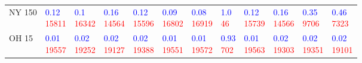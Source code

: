 \begin{tabular}{llllllllllll}
NY 150 & \makecell{\textcolor{blue}{0.12} \\ \textcolor{red}{15811}} & \makecell{\textcolor{blue}{0.1} \\ \textcolor{red}{16342}} & \makecell{\textcolor{blue}{0.16} \\ \textcolor{red}{14564}} & \makecell{\textcolor{blue}{0.12} \\ \textcolor{red}{15596}} & \makecell{\textcolor{blue}{0.09} \\ \textcolor{red}{16802}} & \makecell{\textcolor{blue}{0.08} \\ \textcolor{red}{16919}} & \makecell{\textcolor{blue}{1.0} \\ \textcolor{red}{46}} & \makecell{\textcolor{blue}{0.12} \\ \textcolor{red}{15739}} & \makecell{\textcolor{blue}{0.16} \\ \textcolor{red}{14566}} & \makecell{\textcolor{blue}{0.35} \\ \textcolor{red}{9706}} & \makecell{\textcolor{blue}{0.46} \\ \textcolor{red}{7323}} \\
OH 15 & \makecell{\textcolor{blue}{0.01} \\ \textcolor{red}{19557}} & \makecell{\textcolor{blue}{0.02} \\ \textcolor{red}{19252}} & \makecell{\textcolor{blue}{0.02} \\ \textcolor{red}{19127}} & \makecell{\textcolor{blue}{0.02} \\ \textcolor{red}{19388}} & \makecell{\textcolor{blue}{0.01} \\ \textcolor{red}{19551}} & \makecell{\textcolor{blue}{0.01} \\ \textcolor{red}{19572}} & \makecell{\textcolor{blue}{0.93} \\ \textcolor{red}{702}} & \makecell{\textcolor{blue}{0.01} \\ \textcolor{red}{19563}} & \makecell{\textcolor{blue}{0.02} \\ \textcolor{red}{19303}} & \makecell{\textcolor{blue}{0.02} \\ \textcolor{red}{19351}} & \makecell{\textcolor{blue}{0.02} \\ \textcolor{red}{19101}} \\

\end{tabular}
